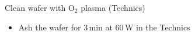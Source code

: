 \item Clean wafer with O$_2$ plasma (Technics)
\begin{itemize}
\item Ash the wafer for 3\,min at 60\,W in the Technics
\end{itemize}